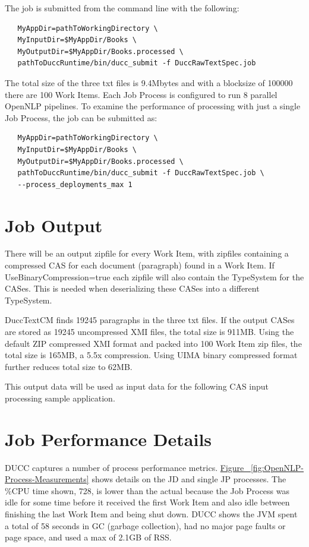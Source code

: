 The job is submitted from the command line with the following:
\begin{verbatim}
   MyAppDir=pathToWorkingDirectory \
   MyInputDir=$MyAppDir/Books \
   MyOutputDir=$MyAppDir/Books.processed \
   pathToDuccRuntime/bin/ducc_submit -f DuccRawTextSpec.job
\end{verbatim}

The total size of the three txt files is 9.4Mbytes and with a blocksize of 100000 there are 100 Work Items. Each Job Process is 
configured to run 8 parallel OpenNLP pipelines. To examine the performance of processing with just a single Job Process, 
the job can be submitted as:

\begin{verbatim}
   MyAppDir=pathToWorkingDirectory \
   MyInputDir=$MyAppDir/Books \
   MyOutputDir=$MyAppDir/Books.processed \
   pathToDuccRuntime/bin/ducc_submit -f DuccRawTextSpec.job \
   --process_deployments_max 1
\end{verbatim}

\section{Job Output}
There will be an output zipfile for every Work Item, with zipfiles containing a compressed CAS for each document (paragraph) 
found in a Work Item. If UseBinaryCompression=true each zipfile will also contain the TypeSystem for the CASes. 
This is needed when deserializing these CASes into a different TypeSystem.

DuccTextCM finds 19245 paragraphs in the three txt files. If the output CASes are stored as 19245 uncompressed XMI files, the total size is 911MB. Using the default ZIP compressed XMI format and packed into 100 Work Item zip files, the total size is 165MB, a 5.5x compression. Using UIMA binary compressed format further reduces total size to 62MB.

This output data will be used as input data for the following CAS input processing sample application.

\section{Job Performance Details}
DUCC captures a number of process performance metrics.
\hyperref[fig:OpenNLP-Process-Measurements]{Figure ~\ref{fig:OpenNLP-Process-Measurements}} shows details on the JD and 
single JP processes. The \%CPU time shown, 728, is lower than the actual because the Job Process was idle 
for some time before it received the first Work Item and also idle between finishing the last Work Item and being shut down.
DUCC shows the JVM spent a total of 58 seconds in 
GC (garbage collection), had no major page faults or page space, and used a max of 2.1GB of RSS.

